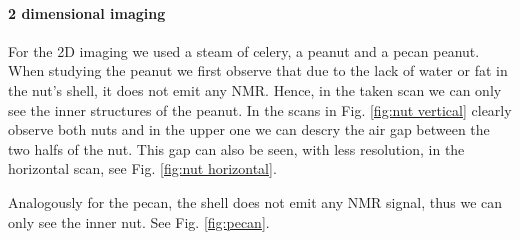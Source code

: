 \paragraph{2 dimensional imaging}
For the 2D imaging we used a steam of celery, a peanut and a pecan peanut. 
When studying the peanut we first observe that due to the lack of water or fat in the nut's shell, it does not emit any NMR. Hence, in the taken scan we can only see the inner structures of the peanut. In the scans in Fig. \ref{fig:nut vertical} clearly observe both nuts and in the upper one we can descry the air gap between the two halfs of the nut. This gap can also be seen, with less resolution, in the horizontal scan, see Fig. \ref{fig:nut horizontal}.

Analogously for the pecan, the shell does not emit any NMR signal, thus we can only see the inner nut. See Fig. \ref{fig:pecan}. 


